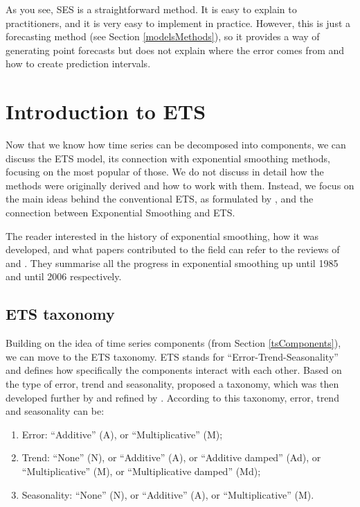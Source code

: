 \documentclass[]{book}
\providecommand{\tightlist}{%
  \setlength{\itemsep}{0pt}\setlength{\parskip}{0pt}}
\theoremstyle{definition}
\theoremstyle{definition}
\theoremstyle{definition}
\theoremstyle{definition}
\theoremstyle{remark}
\begin{document}
As you see, SES is a straightforward method. It is easy to explain to practitioners, and it is very easy to implement in practice. However, this is just a forecasting method (see Section \ref{modelsMethods}), so it provides a way of generating point forecasts but does not explain where the error comes from and how to create prediction intervals.

\hypertarget{ETSConventional}{%
\chapter{Introduction to ETS}\label{ETSConventional}}

Now that we know how time series can be decomposed into components, we can discuss the ETS model, its connection with exponential smoothing methods, focusing on the most popular of those. We do not discuss in detail how the methods were originally derived and how to work with them. Instead, we focus on the main ideas behind the conventional ETS, as formulated by \citet{Hyndman2008b}, and the connection between Exponential Smoothing and ETS.

The reader interested in the history of exponential smoothing, how it was developed, and what papers contributed to the field can refer to the reviews of \citet{Gardner1985} and \citet{Gardner2006}. They summarise all the progress in exponential smoothing up until 1985 and until 2006 respectively.

\hypertarget{ETSTaxonomy}{%
\section{ETS taxonomy}\label{ETSTaxonomy}}

Building on the idea of time series components (from Section \ref{tsComponents}), we can move to the ETS taxonomy. ETS stands for ``Error-Trend-Seasonality'' and defines how specifically the components interact with each other. Based on the type of error, trend and seasonality, \citet{Pegels1969} proposed a taxonomy, which was then developed further by \citet{Hyndman2002} and refined by \citet{Hyndman2008b}. According to this taxonomy, error, trend and seasonality can be:

\begin{enumerate}
\def\labelenumi{\arabic{enumi}.}
\tightlist
\item
  Error: ``Additive'' (A), or ``Multiplicative'' (M);
\item
  Trend: ``None'' (N), or ``Additive'' (A), or ``Additive damped'' (Ad), or ``Multiplicative'' (M), or ``Multiplicative damped'' (Md);
\item
  Seasonality: ``None'' (N), or ``Additive'' (A), or ``Multiplicative'' (M).
\end{enumerate}
\end{document}
